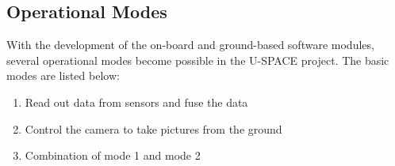 \subsection{Operational Modes}

With the development of the on-board and ground-based software modules, several operational modes become possible in the \ac{U-SPACE} project. The basic modes are listed below:

\begin{enumerate}
\item Read out data from sensors and fuse the data
\item Control the camera to take pictures from the ground
\item Combination of mode 1 and mode 2
\end{enumerate}